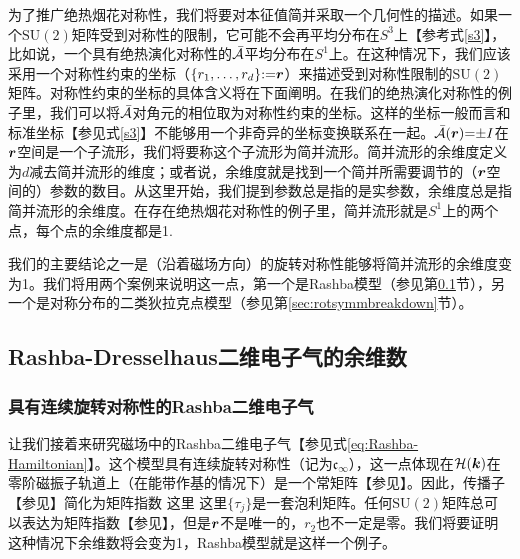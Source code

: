 为了推广绝热烟花对称性，我们将要对本征值简并采取一个几何性的描述。如果一个$\text{SU}(2)$矩阵受到对称性的限制，它可能不会再平均分布在$S^3$上【参考式\ref{s3}】，比如说，一个具有绝热演化对称性的${\cal \bar{A}}$平均分布在$S^1$上。在这种情况下，我们应该采用一个对称性约束的坐标（$\{r_1,\ldots,r_{d}\}{:}{=}\boldsymbol{r}$）来描述受到对称性限制的$\text{SU}(2)$矩阵。对称性约束的坐标的具体含义将在下面阐明。在我们的绝热演化对称性的例子里，我们可以将${\cal \bar{A}}$对角元的相位取为对称性约束的坐标。这样的坐标一般而言和标准坐标【参见式\ref{s3}】不能够用一个非奇异的坐标变换联系在一起。${\cal \bar{A}}(\boldsymbol{r}){=}{\pm}I$在$\boldsymbol{r}$空间是一个子流形，我们将要称这个子流形为简并流形。简并流形的余维度定义为$d$减去简并流形的维度；或者说，余维度就是找到一个简并所需要调节的（$\boldsymbol{r}$空间的）参数的数目。从这里开始，我们提到参数总是指的是实参数，余维度总是指简并流形的余维度。在存在绝热烟花对称性的例子里，简并流形就是$S^1$上的两个点，每个点的余维度都是1.

我们的主要结论之一是（沿着磁场方向）的旋转对称性能够将简并流形的余维度变为1。我们将用两个案例来说明这一点，第一个是Rashba模型（参见第\ref{sec:singleparameterrashba}节），另一个是对称分布的二类狄拉克点模型（参见第\ref{sec:rotsymmbreakdown}节）。

\subsection{Rashba-Dresselhaus二维电子气的余维数}\label{sec:singleparameterrashba}

\subsubsection{具有连续旋转对称性的Rashba二维电子气}\label{sec:ctsrot}

让我们接着来研究磁场中的Rashba二维电子气【参见式\ref{eq:Rashba-Hamiltonian}】。这个模型具有连续旋转对称性（记为$\mathfrak{c}_{\infty}$），这一点体现在${\cal H}(\boldsymbol{k})$在零阶磁振子轨道上（在能带作基的情况下）是一个常矩阵【参见】。因此，传播子【参见】简化为矩阵指数
这里
这里$\{\tau_j\}$是一套泡利矩阵。任何$\text{SU}(2)$矩阵总可以表达为矩阵指数【参见】，但是$\boldsymbol{r}$不是唯一的，$r_2$也不一定是零。我们将要证明这种情况下余维数将会变为1，Rashba模型就是这样一个例子。


